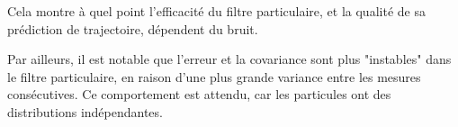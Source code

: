 \documentclass[../CSC_5RO12_TA_TP3.tex]{subfiles}
\begin{document}
\noindent Cela montre à quel point l'efficacité du filtre particulaire, et la qualité de sa prédiction de trajectoire, dépendent du bruit.

\begin{remark}
    Par ailleurs, il est notable que l'erreur et la covariance sont plus "instables" dans le filtre particulaire, en raison d'une plus grande variance entre les mesures consécutives. Ce comportement est attendu, car les particules ont des distributions indépendantes.
\end{remark}
\end{document}
